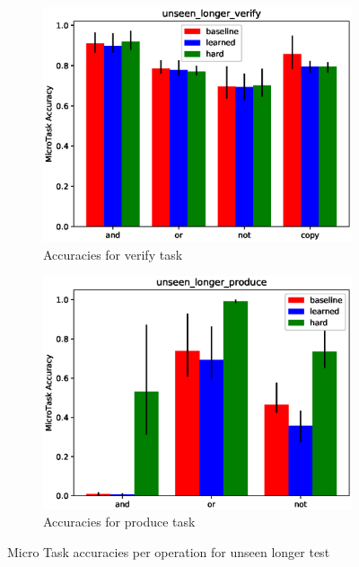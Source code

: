 \begin{figure}[ht] 
	\begin{subfigure}[b]{0.5\linewidth}
		\centering
		\includegraphics[width=0.95\linewidth]{./figs/micro/unseen_longer_verify}
		\caption{Accuracies for verify task } 
		\label{mtul1} 
		\vspace{2ex}
	\end{subfigure}%
	\begin{subfigure}[b]{0.5\linewidth}
		\centering
		\includegraphics[width=0.95\linewidth]{./figs/micro/unseen_longer_produce}
		\caption{Accuracies for produce task } 
		\label{mtul2} 
		\vspace{2ex}
	\end{subfigure}
	\caption{Micro Task accuracies per operation for unseen longer test }
	\label{mtul}
\end{figure}